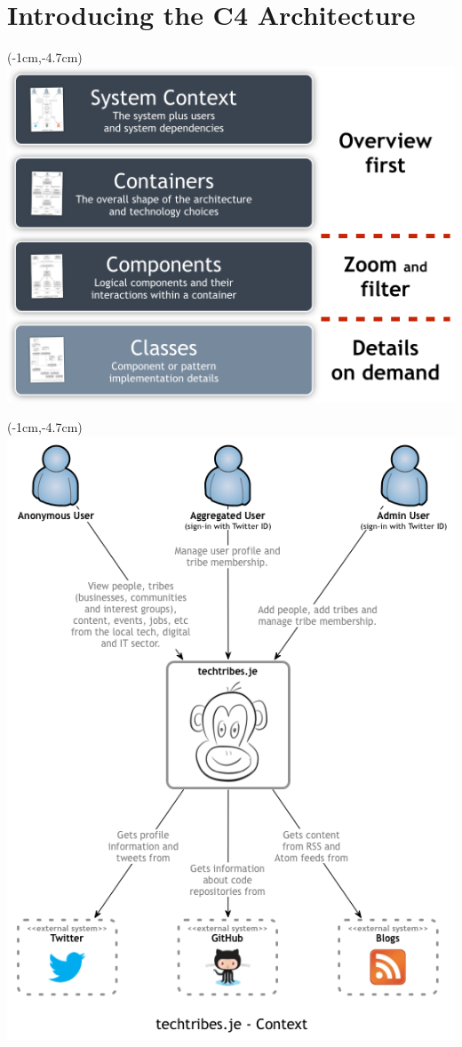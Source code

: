 \documentclass[xelatex,10pt]{beamer}
\begin{document}
\section{Introducing the C4 Architecture}
\begin{frame}[plain]
\begin{textblock*}{0cm}(-1cm,-4.7cm)
	\includegraphics[width=1.0\paperwidth]{c4overview.png}
\end{textblock*}
\end{frame}
\begin{frame}[plain]
\begin{textblock*}{0cm}(-1cm,-4.7cm)
	\includegraphics[width=1.0\paperwidth]{c4systemcontext.png}
\end{textblock*}
\end{frame}
\end{document}

